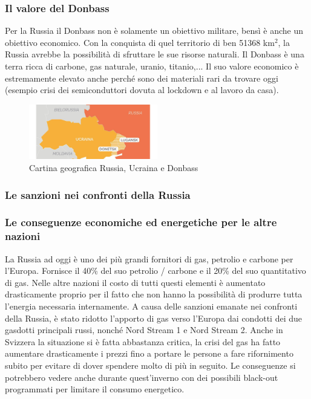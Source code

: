 \documentclass[a4paper, 12pt]{article}
\begin{document}

\subsubsection{Il valore del Donbass}

Per la Russia il Donbass non è solamente un obiettivo militare, bensì è anche un obiettivo economico. Con la conquista di quel territorio di ben 51368 km$^2$, la Russia avrebbe la possibilità di sfruttare le sue risorse naturali. Il Donbass è una terra ricca di carbone, gas naturale, uranio, titanio,... Il suo valore economico è estremamente elevato anche perché sono dei materiali rari da trovare oggi (esempio crisi dei semiconduttori dovuta al lockdown e al lavoro da casa).

\begin{figure}[h]
    \centering
    \includegraphics[width=0.5\textwidth]{images/map.jpg}
    \caption{Cartina geografica Russia, Ucraina e Donbass}
\end{figure}



\subsubsection{Le sanzioni nei confronti della Russia}

\subsubsection{Le conseguenze economiche ed energetiche per le altre nazioni}

La Russia ad oggi è uno dei più grandi fornitori di gas, petrolio e carbone per l'Europa. Fornisce il 40\% del suo petrolio / carbone e il 20\% del suo quantitativo di gas. Nelle altre nazioni il costo di tutti questi elementi è aumentato drasticamente proprio per il fatto che non hanno la possibilità di produrre tutta l'energia necessaria internamente. A causa delle sanzioni emanate nei confronti della Russia, è stato ridotto l'apporto di gas verso l'Europa dai condotti dei due gasdotti principali russi, nonché Nord Stream 1 e Nord Stream 2. Anche in Svizzera la situazione si è fatta abbastanza critica, la crisi del gas ha fatto aumentare drasticamente i prezzi fino a portare le persone a fare rifornimento subito per evitare di dover spendere molto di più in seguito. Le conseguenze si potrebbero vedere anche durante quest'inverno con dei possibili black-out programmati per limitare il consumo energetico. 
\end{document}
